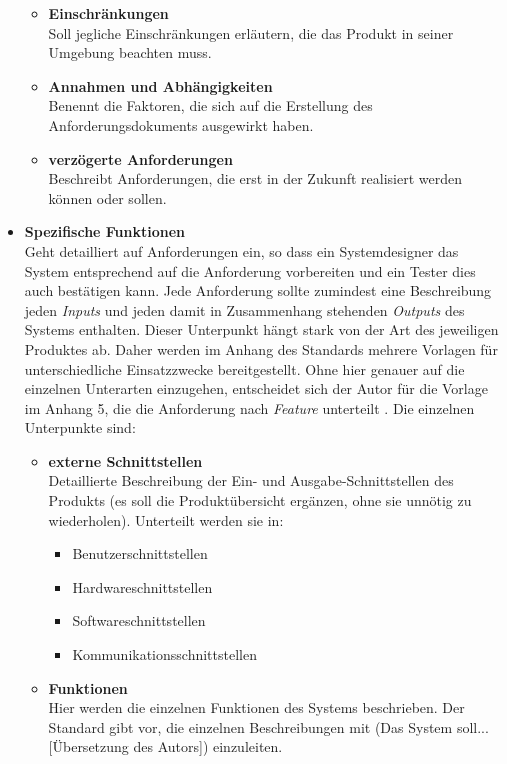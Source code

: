 \begin{itemize}
\begin{itemize}
		\item \textbf{Einschränkungen} \\
		Soll jegliche Einschränkungen erläutern, die das Produkt in seiner Umgebung beachten muss.
		\item \textbf{Annahmen und Abhängigkeiten} \\
		Benennt die Faktoren, die sich auf die Erstellung des Anforderungsdokuments ausgewirkt haben.
		\item \textbf{verzögerte Anforderungen} \\
		Beschreibt Anforderungen, die erst in der Zukunft realisiert werden können oder sollen.
	\end{itemize}
	\item \textbf{Spezifische Funktionen} \citep[vgl.][S. 15 - 20]{ieee1998}\\
	Geht detailliert auf Anforderungen ein, so dass ein Systemdesigner das System entsprechend auf die Anforderung vorbereiten und ein Tester dies auch bestätigen kann. 
	Jede Anforderung sollte zumindest eine Beschreibung jeden \textit{Inputs} und jeden damit in Zusammenhang stehenden \textit{Outputs} des Systems enthalten. Dieser Unterpunkt hängt stark von der Art des jeweiligen Produktes ab. Daher werden im Anhang des Standards mehrere Vorlagen für unterschiedliche Einsatzzwecke bereitgestellt. Ohne hier genauer auf die einzelnen Unterarten einzugehen, entscheidet sich der Autor für die Vorlage im Anhang 5, die die Anforderung nach \textit{Feature} unterteilt \citep[vgl.][23]{ieee1998}. Die einzelnen Unterpunkte sind:
	\begin{itemize}
		\item \textbf{externe Schnittstellen} \\
		Detaillierte Beschreibung der Ein- und Ausgabe-Schnittstellen des Produkts (es soll die Produktübersicht ergänzen, ohne sie unnötig zu wiederholen). Unterteilt werden sie in:
		\begin{itemize}
			\item Benutzerschnittstellen
			\item Hardwareschnittstellen
			\item Softwareschnittstellen
			\item Kommunikationsschnittstellen
		\end{itemize}
		\item \textbf{Funktionen} \\
		Hier werden die einzelnen Funktionen des Systems beschrieben. Der Standard gibt vor, die einzelnen Beschreibungen mit (Das System soll... [Übersetzung des Autors]) \citep[][16]{ieee1998} einzuleiten.

\end{itemize}
\end{itemize}
